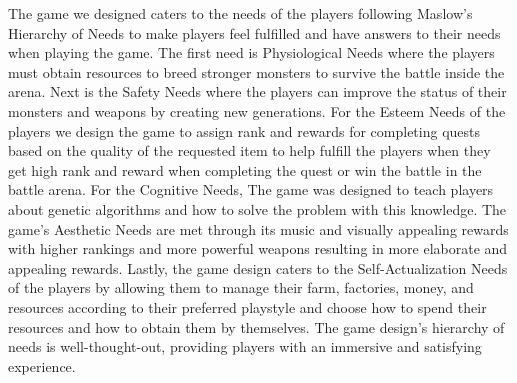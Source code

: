 \documentclass[12pt,oneside,openright,a4paper]{cpe-english-project}
\begin{document}
\hspace{2em}The game we designed caters to the needs of the players following Maslow's Hierarchy of Needs to make players feel fulfilled and have answers to their needs when playing the game. The first need is Physiological Needs where the players must obtain resources to breed stronger monsters to survive the battle inside the arena. Next is the Safety Needs where the players can improve the status of their monsters and weapons by creating new generations. For the Esteem Needs of the players we design the game to assign rank and rewards for completing quests based on the quality of the requested item to help fulfill the players when they get high rank and reward when completing the quest or win the battle in the battle arena. For the Cognitive Needs, The game was designed to teach players about genetic algorithms and how to solve the problem with this knowledge. The game's Aesthetic Needs are met through its music and visually appealing rewards with higher rankings and more powerful weapons resulting in more elaborate and appealing rewards. Lastly, the game design caters to the Self-Actualization Needs of the players by allowing them to manage their farm, factories, money, and resources according to their preferred playstyle and choose how to spend their resources and how to obtain them by themselves. The game design's hierarchy of needs is well-thought-out, providing players with an immersive and satisfying experience.
\end{document}
